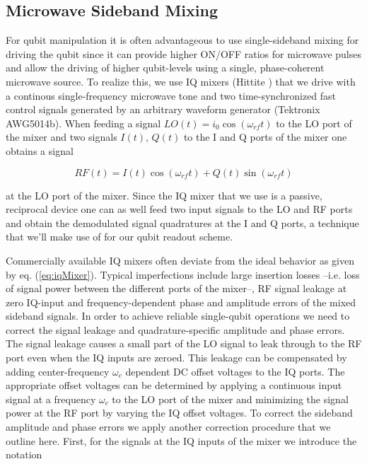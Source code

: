 \subsection{Microwave Sideband Mixing}

For qubit manipulation it is often advantageous to use single-sideband mixing for driving the qubit since it can provide higher ON/OFF ratios for microwave pulses and allow the driving of higher qubit-levels using a single, phase-coherent microwave source. To realize this, we use IQ mixers (Hittite ) that we drive with a continous single-frequency microwave tone and two time-synchronized fast control signals generated by an arbitrary waveform generator (Tektronix AWG5014b). When feeding a signal $LO(t) = i_0 \cos{(\omega_{rf} t )}$ to the LO port of the mixer and two signals $I(t)$, $Q(t)$ to the I and Q ports of the mixer one obtains a signal

\begin{equation}
RF(t) = I(t)\cos{(\omega_{rf} t)}+Q(t)\sin{(\omega_{rf} t)} \label{eq:iqMixer}
\end{equation}

at the LO port of the mixer. Since the IQ mixer that we use is a passive, reciprocal device one can as well feed two input signals to the LO and RF ports and obtain the demodulated signal quadratures at the I and Q ports, a technique that we'll make use of for our qubit readout scheme.

Commercially available IQ mixers often deviate from the ideal behavior as given by eq. (\ref{eq:iqMixer}). Typical imperfections include large insertion losses --i.e. loss of signal power between the different ports of the mixer--, RF signal leakage at zero IQ-input and frequency-dependent phase and amplitude errors of the mixed sideband signals. In order to achieve reliable single-qubit operations we need to correct the signal leakage and quadrature-specific amplitude and phase errors. The signal leakage causes a small part of the LO signal to leak through to the RF port even when the IQ inputs are zeroed. This leakage can be compensated by adding center-frequency $\omega_c$ dependent DC offset voltages to the IQ ports. The appropriate offset voltages can be determined by applying a continuous input signal at a frequency $\omega_c$ to the LO port of the mixer and minimizing the signal power at the RF port by varying the IQ offset voltages. To correct the sideband amplitude and phase errors we apply another correction procedure that we outline here. First, for the signals at the IQ inputs of the mixer we introduce the notation

